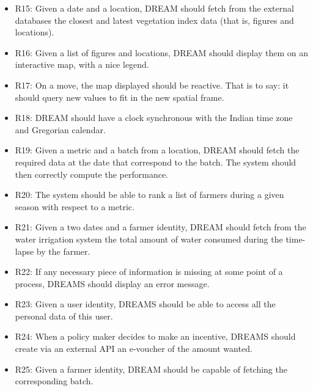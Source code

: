 \begin{itemize}
	\item
	R15: Given a date and a location, DREAM should fetch from the external databases the  closest and latest vegetation index data (that is, figures and locations).
	\item
	R16: Given a list of figures and locations, DREAM should display them on an interactive map, with a nice legend.
	\item
	R17: On a move, the map displayed should be reactive. That is to say: it should query new values to fit in the new spatial frame.
	\item
	R18: DREAM should have a clock synchronous with the Indian time zone and Gregorian calendar.
	\item
	R19: Given a metric and a batch from a location, DREAM should fetch the required data at the date that correspond to the batch. The system should then correctly compute the performance.
	\item
	R20: The system should be able to rank a list of farmers during a given season with respect to a metric.
	\item
	R21: Given a two dates and a farmer identity, DREAM should fetch from the water irrigation system the total amount of water consumed during the time-lapse by the farmer.
	\item
	R22: If any necessary piece of information is missing at some point of a process, DREAMS should display an error message.
	\item
	R23: Given a user identity, DREAMS should be able to access all the personal data of this user.
	\item
	R24: When a policy maker decides to make an incentive, DREAMS should create via an external API an e-voucher of the amount wanted. 
	\item
	R25: Given a farmer identity, DREAM should be capable of fetching the corresponding batch.

\end{itemize}


